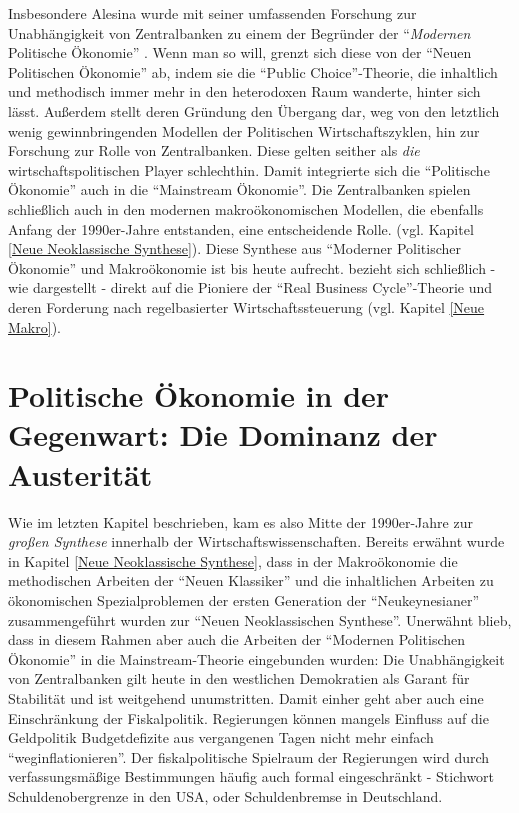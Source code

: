 Insbesondere Alesina wurde mit seiner umfassenden Forschung zur Unabhängigkeit von Zentralbanken zu einem der Begründer der "`\textit{Modernen} Politische Ökonomie"' \parencite{Mineo2020}. Wenn man so will, grenzt sich diese von der "`Neuen Politischen Ökonomie"' ab, indem sie die "`Public Choice"'-Theorie, die inhaltlich und methodisch immer mehr in den heterodoxen Raum wanderte, hinter sich lässt. Außerdem stellt deren Gründung den Übergang dar, weg von den letztlich wenig gewinnbringenden Modellen der Politischen Wirtschaftszyklen, hin zur Forschung zur Rolle von Zentralbanken. Diese gelten seither als \textit{die} wirtschaftspolitischen Player schlechthin. Damit integrierte sich die "`Politische Ökonomie"' auch in die "`Mainstream Ökonomie"'. Die Zentralbanken spielen schließlich auch in den modernen makroökonomischen Modellen, die ebenfalls Anfang der 1990er-Jahre entstanden, eine entscheidende Rolle. (vgl. Kapitel \ref{Neue Neoklassische Synthese}). Diese Synthese aus "`Moderner Politischer Ökonomie"' und Makroökonomie ist bis heute aufrecht. \textcite[S. 653]{Alesina1987} bezieht sich schließlich - wie dargestellt - direkt auf die Pioniere der "`Real Business Cycle"'-Theorie \textcite{Kydland1977} und deren Forderung nach regelbasierter Wirtschaftssteuerung (vgl. Kapitel \ref{Neue Makro}). 

\section{Politische Ökonomie in der Gegenwart: Die Dominanz der Austerität}
\label{PolEcon_Gegenwart}

Wie im letzten Kapitel beschrieben, kam es also Mitte der 1990er-Jahre zur \textit{großen Synthese} innerhalb der Wirtschaftswissenschaften. Bereits erwähnt wurde in Kapitel \ref{Neue Neoklassische Synthese}, dass in der Makroökonomie die methodischen Arbeiten der "`Neuen Klassiker"' und die inhaltlichen Arbeiten zu ökonomischen Spezialproblemen der ersten Generation der "`Neukeynesianer"' zusammengeführt wurden zur "`Neuen Neoklassischen Synthese"'. Unerwähnt blieb, dass in diesem Rahmen aber auch die Arbeiten der "`Modernen Politischen Ökonomie"' in die Mainstream-Theorie eingebunden wurden: Die Unabhängigkeit von Zentralbanken gilt heute in den westlichen Demokratien als Garant für Stabilität und ist weitgehend unumstritten. Damit einher geht aber auch eine Einschränkung der Fiskalpolitik. Regierungen können mangels Einfluss auf die Geldpolitik Budgetdefizite aus vergangenen Tagen nicht mehr einfach "`weginflationieren"'. Der fiskalpolitische Spielraum der Regierungen wird durch verfassungsmäßige Bestimmungen häufig auch formal eingeschränkt - Stichwort Schuldenobergrenze in den USA, oder Schuldenbremse in Deutschland.

